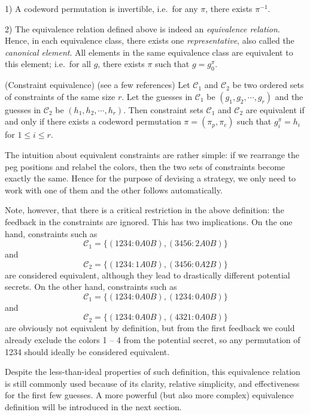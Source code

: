 1) A codeword permutation is invertible, i.e.\ for any $\pi$, there exists $\pi^{-1}$.

2) The equivalence relation defined above is indeed an \emph{equivalence relation}. Hence, in each equivalence class, there exists one \emph{representative}, also called the \emph{canonical element}. All elements in the same equivalence class are equivalent to this element; i.e.\ for all $g$, there exists $\pi$ such that $g = g_0^\pi$.

\begin{definition}
(Constraint equivalence) (see a few references) Let $\mathcal{C}_1$ and $\mathcal{C}_2$ be two ordered sets of constraints of the same size $r$. Let the guesses in $\mathcal{C}_1$ be $(g_1,g_2,\cdots,g_r)$ and the guesses in $\mathcal{C}_2$ be $(h_1,h_2,\cdots,h_r)$. Then constraint sets $\mathcal{C}_1$ and $\mathcal{C}_2$ are equivalent if and only if there exists a codeword permutation $\pi=(\pi_p,\pi_c)$ such that
$g_i^\pi = h_i$ for $1 \le i \le r$.
\end{definition}

The intuition about equivalent constraints are rather simple: if we rearrange the peg positions and relabel the colors, then the two sets of constraints become exactly the same. Hence for the purpose of devising a strategy, we only need to work with one of them and the other follows automatically.

Note, however, that there is a critical restriction in the above definition: the feedback in the constraints are ignored. This has two implications. On the one hand, constraints such as 
\[
\mathcal{C}_1 = \{ (1234:0A0B), (3456:2A0B) \}
\]
and
\[
\mathcal{C}_2 = \{ (1234:1A0B), (3456:0A2B) \}
\]
are considered equivalent, although they lead to drastically different potential secrets. On the other hand, constraints such as
\[
\mathcal{C}_1 = \{ (1234:0A0B), (1234:0A0B) \}
\]
and
\[
\mathcal{C}_2 = \{ (1234:0A0B), (4321:0A0B) \}
\]
are obviously not equivalent by definition, but from the first feedback  we could already exclude the colors 1 -- 4 from the potential secret, so any permutation of 1234 should ideally be considered equivalent.

Despite the less-than-ideal properties of such definition, this equivalence relation is still commonly used \cite{neuwirth81,koyama93,francis10} because of its clarity, relative simplicity, and effectiveness for the first few guesses. A more powerful (but also more complex) equivalence definition will be introduced in the next section.


